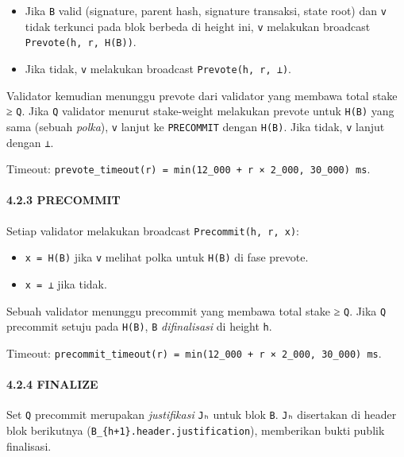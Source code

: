 \documentclass[11pt,a4paper]{article}
\providecommand{\tightlist}{\setlength{\itemsep}{0pt}\setlength{\parskip}{0pt}}
\begin{document}
\begin{itemize}
\tightlist
\item
  Jika \texttt{B} valid (signature, parent hash, signature transaksi, state root) dan \texttt{v} tidak terkunci pada blok berbeda di height ini, \texttt{v} melakukan broadcast \texttt{Prevote(h,\ r,\ H(B))}.
\item
  Jika tidak, \texttt{v} melakukan broadcast \texttt{Prevote(h,\ r,\ ⊥)}.
\end{itemize}

Validator kemudian menunggu prevote dari validator yang membawa total stake ≥ \texttt{Q}. Jika \texttt{Q} validator menurut stake-weight melakukan prevote untuk \texttt{H(B)} yang sama (sebuah \emph{polka}), \texttt{v} lanjut ke \texttt{PRECOMMIT} dengan \texttt{H(B)}. Jika tidak, \texttt{v} lanjut dengan \texttt{⊥}.

Timeout: \texttt{prevote\_timeout(r)\ =\ min(12\_000\ +\ r\ ×\ 2\_000,\ 30\_000)\ ms}.

\hypertarget{precommit}{%
\paragraph{4.2.3 PRECOMMIT}\label{precommit}}

Setiap validator melakukan broadcast \texttt{Precommit(h,\ r,\ x)}:

\begin{itemize}
\tightlist
\item
  \texttt{x\ =\ H(B)} jika \texttt{v} melihat polka untuk \texttt{H(B)} di fase prevote.
\item
  \texttt{x\ =\ ⊥} jika tidak.
\end{itemize}

Sebuah validator menunggu precommit yang membawa total stake ≥ \texttt{Q}. Jika \texttt{Q} precommit setuju pada \texttt{H(B)}, \texttt{B} \emph{difinalisasi} di height \texttt{h}.

Timeout: \texttt{precommit\_timeout(r)\ =\ min(12\_000\ +\ r\ ×\ 2\_000,\ 30\_000)\ ms}.

\hypertarget{finalize}{%
\paragraph{4.2.4 FINALIZE}\label{finalize}}

Set \texttt{Q} precommit merupakan \emph{justifikasi} \texttt{Jₕ} untuk blok \texttt{B}. \texttt{Jₕ} disertakan di header blok berikutnya (\texttt{B\_\{h+1\}.header.justification}), memberikan bukti publik finalisasi.
\end{document}
